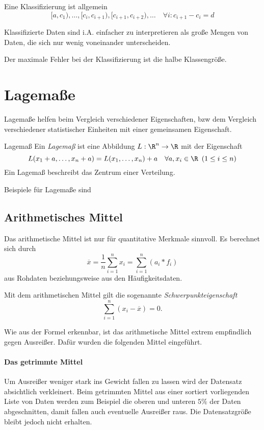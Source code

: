 Eine Klassifizierung ist allgemein
\begin{equation*}
	[a, c_1), \ldots, [c_i,c_{i+1}), [c_{i+1},c_{i+2}), \ldots\quad \forall i: c_{i+1}-c_i=d
\end{equation*}

Klassifizierte Daten sind i.A. einfacher zu interpretieren als große Mengen von Daten, die sich nur wenig voneinander unterscheiden.

Der maximale Fehler bei der Klassifizierung ist die halbe Klassengröße.


\section{Lagemaße}
Lagemaße helfen beim Vergleich verschiedener Eigenschaften, bzw dem Vergleich verschiedener statistischer Einheiten mit einer gemeinsamen Eigenschaft. 

\begin{definition}{Lagemaß}
	Ein \emph{Lagemaß} ist eine Abbildung $L:\R^n\rightarrow \R$ mit der Eigenschaft
	\begin{equation*}
		L(x_1+a,\ldots,x_n+a)=L(x_1,\ldots,x_n)+a\quad \forall a,x_i\in\R\enspace (1\leq i\leq n)
	\end{equation*}
	Ein Lagemaß beschreibt das Zentrum einer Verteilung.
\end{definition}

Beispiele für Lagemaße sind

\subsection{Arithmetisches Mittel}
Das arithmetische Mittel ist nur für quantitative Merkmale sinnvoll. Es berechnet sich durch
\begin{equation*}
    \overline x=\frac 1n \sum\limits_{i=1}^n x_i=\sum\limits_{i=1}^n (a_i*f_i)
\end{equation*}
aus Rohdaten beziehungsweise aus den Häufigkeitsdaten.

Mit dem arithmetischen Mittel gilt die sogenannte \emph{Schwerpunkteigenschaft}
\begin{equation*}
	\sum\limits_{i=1}^n(x_i-\overline x)=0.
\end{equation*}

Wie aus der Formel erkennbar, ist das arithmetische Mittel extrem empfindlich gegen Ausreißer. Dafür wurden die folgenden Mittel eingeführt.

\paragraph{Das getrimmte Mittel}
Um Ausreißer weniger stark ins Gewicht fallen zu lassen wird der Datensatz absichtlich verkleinert. Beim getrimmten Mittel aus einer sortiert vorliegenden Liste von Daten werden zum Beispiel die oberen und unteren $5\%$ der Daten abgeschnitten, damit fallen auch eventuelle Ausreißer raus. Die Datensatzgröße bleibt jedoch nicht erhalten.

